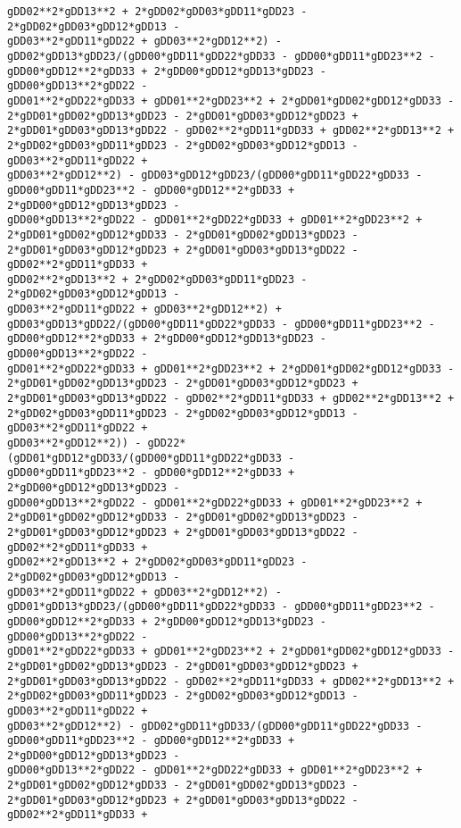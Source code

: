 \documentclass[landscape,letterpaper,10pt,english]{article}
\begin{document}
\begin{Verbatim}[commandchars=\\\{\}]
gDD02**2*gDD13**2 + 2*gDD02*gDD03*gDD11*gDD23 - 2*gDD02*gDD03*gDD12*gDD13 -
gDD03**2*gDD11*gDD22 + gDD03**2*gDD12**2) -
gDD02*gDD13*gDD23/(gDD00*gDD11*gDD22*gDD33 - gDD00*gDD11*gDD23**2 -
gDD00*gDD12**2*gDD33 + 2*gDD00*gDD12*gDD13*gDD23 - gDD00*gDD13**2*gDD22 -
gDD01**2*gDD22*gDD33 + gDD01**2*gDD23**2 + 2*gDD01*gDD02*gDD12*gDD33 -
2*gDD01*gDD02*gDD13*gDD23 - 2*gDD01*gDD03*gDD12*gDD23 +
2*gDD01*gDD03*gDD13*gDD22 - gDD02**2*gDD11*gDD33 + gDD02**2*gDD13**2 +
2*gDD02*gDD03*gDD11*gDD23 - 2*gDD02*gDD03*gDD12*gDD13 - gDD03**2*gDD11*gDD22 +
gDD03**2*gDD12**2) - gDD03*gDD12*gDD23/(gDD00*gDD11*gDD22*gDD33 -
gDD00*gDD11*gDD23**2 - gDD00*gDD12**2*gDD33 + 2*gDD00*gDD12*gDD13*gDD23 -
gDD00*gDD13**2*gDD22 - gDD01**2*gDD22*gDD33 + gDD01**2*gDD23**2 +
2*gDD01*gDD02*gDD12*gDD33 - 2*gDD01*gDD02*gDD13*gDD23 -
2*gDD01*gDD03*gDD12*gDD23 + 2*gDD01*gDD03*gDD13*gDD22 - gDD02**2*gDD11*gDD33 +
gDD02**2*gDD13**2 + 2*gDD02*gDD03*gDD11*gDD23 - 2*gDD02*gDD03*gDD12*gDD13 -
gDD03**2*gDD11*gDD22 + gDD03**2*gDD12**2) +
gDD03*gDD13*gDD22/(gDD00*gDD11*gDD22*gDD33 - gDD00*gDD11*gDD23**2 -
gDD00*gDD12**2*gDD33 + 2*gDD00*gDD12*gDD13*gDD23 - gDD00*gDD13**2*gDD22 -
gDD01**2*gDD22*gDD33 + gDD01**2*gDD23**2 + 2*gDD01*gDD02*gDD12*gDD33 -
2*gDD01*gDD02*gDD13*gDD23 - 2*gDD01*gDD03*gDD12*gDD23 +
2*gDD01*gDD03*gDD13*gDD22 - gDD02**2*gDD11*gDD33 + gDD02**2*gDD13**2 +
2*gDD02*gDD03*gDD11*gDD23 - 2*gDD02*gDD03*gDD12*gDD13 - gDD03**2*gDD11*gDD22 +
gDD03**2*gDD12**2)) - gDD22*(gDD01*gDD12*gDD33/(gDD00*gDD11*gDD22*gDD33 -
gDD00*gDD11*gDD23**2 - gDD00*gDD12**2*gDD33 + 2*gDD00*gDD12*gDD13*gDD23 -
gDD00*gDD13**2*gDD22 - gDD01**2*gDD22*gDD33 + gDD01**2*gDD23**2 +
2*gDD01*gDD02*gDD12*gDD33 - 2*gDD01*gDD02*gDD13*gDD23 -
2*gDD01*gDD03*gDD12*gDD23 + 2*gDD01*gDD03*gDD13*gDD22 - gDD02**2*gDD11*gDD33 +
gDD02**2*gDD13**2 + 2*gDD02*gDD03*gDD11*gDD23 - 2*gDD02*gDD03*gDD12*gDD13 -
gDD03**2*gDD11*gDD22 + gDD03**2*gDD12**2) -
gDD01*gDD13*gDD23/(gDD00*gDD11*gDD22*gDD33 - gDD00*gDD11*gDD23**2 -
gDD00*gDD12**2*gDD33 + 2*gDD00*gDD12*gDD13*gDD23 - gDD00*gDD13**2*gDD22 -
gDD01**2*gDD22*gDD33 + gDD01**2*gDD23**2 + 2*gDD01*gDD02*gDD12*gDD33 -
2*gDD01*gDD02*gDD13*gDD23 - 2*gDD01*gDD03*gDD12*gDD23 +
2*gDD01*gDD03*gDD13*gDD22 - gDD02**2*gDD11*gDD33 + gDD02**2*gDD13**2 +
2*gDD02*gDD03*gDD11*gDD23 - 2*gDD02*gDD03*gDD12*gDD13 - gDD03**2*gDD11*gDD22 +
gDD03**2*gDD12**2) - gDD02*gDD11*gDD33/(gDD00*gDD11*gDD22*gDD33 -
gDD00*gDD11*gDD23**2 - gDD00*gDD12**2*gDD33 + 2*gDD00*gDD12*gDD13*gDD23 -
gDD00*gDD13**2*gDD22 - gDD01**2*gDD22*gDD33 + gDD01**2*gDD23**2 +
2*gDD01*gDD02*gDD12*gDD33 - 2*gDD01*gDD02*gDD13*gDD23 -
2*gDD01*gDD03*gDD12*gDD23 + 2*gDD01*gDD03*gDD13*gDD22 - gDD02**2*gDD11*gDD33 +

\end{Verbatim}
\end{document}
